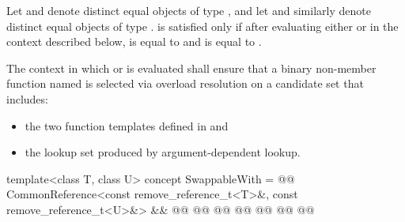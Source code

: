 \begin{removedblock}
\begin{itemdescr}
\pnum
Let  and  denote distinct equal objects of type ,
and let  and  similarly denote distinct equal objects of
type .  is satisfied only if after
evaluating either  or  in the context
described below,  is equal to  and  is equal to
.

\pnum
The context in which  or  is evaluated
shall ensure that a binary non-member function named  is selected via
overload resolution on a candidate set that includes:
\begin{itemize}
\item the two  function templates defined in
   and
\item the lookup set produced by argument-dependent
  lookup.
\end{itemize}
\end{itemdescr}
\end{removedblock}

%
\begin{itemdecl}
template<class T, class U>
  concept SwappableWith =
    @@
    CommonReference<const remove_reference_t<T>&, const remove_reference_t<U>&> &&
    @@
    @@
      @@
      @@
      @@
      @@
    @\added{\};}@
\end{itemdecl}

